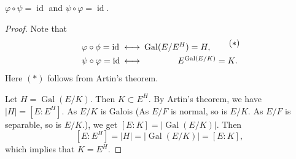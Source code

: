 \documentclass[twoside]{article}
\DeclareMathOperator\Gal{Gal}
\DeclareMathOperator\id{id}
\theoremstyle{remark}
\newcounter{theorem}
\begin{document}
\begin{theorem}
  \(\varphi \circ \psi = \id\) and \(\psi \circ \varphi = \id\).
\end{theorem}

\begin{proof}
  Note that
  \begin{displaymath}
    \begin{array}{l@{\enspace}c@{\enspace}r}
      \varphi \circ \phi = \id & \longleftrightarrow & \Gal(E/E^H) = H, \tag*{\parbox{1em}{\((*)\)\\\phantom{}}} \\
      \psi \circ \varphi = \id & \longleftrightarrow & E^{\Gal(E/K)} = K.
    \end{array}
  \end{displaymath}
  Here \((*)\) follows from Artin's theorem.
  
  Let \(H = \Gal(E/K)\). Then \(K \subset E^H\). By Artin's theorem, we have \(|H| = [E:E^H]\). As \(E/K\) is Galois (As \(E/F\) is normal, so is \(E/K\). As \(E/F\) is separable, so is \(E/K\).), we get \([E:K] = \lvert\Gal(E/K)\rvert\). Then
  \[ [E:E^H] = |H| = \lvert\Gal(E/K)\rvert = [E:K], \]
  which implies that \(K = E^H\).
\end{proof}
\end{document}
